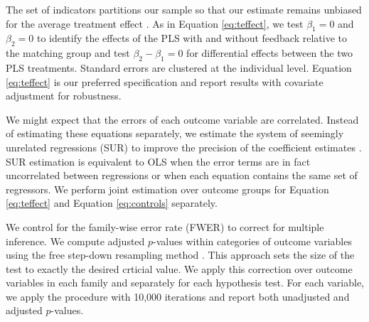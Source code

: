 \documentclass[11pt]{article}
\begin{document}
		The set of indicators partitions our sample so that our estimate remains unbiased for the average treatment effect \parencite{lin_agnostic_2013}. As in Equation \ref{eq:teffect}, we test $\beta_{1} = 0$ and $\beta_{2} = 0$ to identify the effects of the PLS with and without feedback relative to the matching group and test $\beta_{2} - \beta_{1} = 0$ for differential effects between the two PLS treatments. Standard errors are clustered at the individual level. Equation \ref{eq:teffect} is our preferred specification and report results with covariate adjustment for robustness.


		We might expect that the errors of each outcome variable are correlated. Instead of estimating these equations separately, we estimate the system of seemingly unrelated regressions (SUR) to improve the precision of the coefficient estimates \parencite{zellner_efficient_1962}. SUR estimation is equivalent to OLS when the error terms are in fact uncorrelated between regressions or when each equation contains the same set of regressors. We perform joint estimation over outcome groups for Equation \ref{eq:teffect} and Equation \ref{eq:controls} separately.

		We control for the family-wise error rate (FWER) to correct for multiple inference. We compute adjusted $p$-values within categories of outcome variables using the free step-down resampling method \parencite{westfall_resampling-based_1993,anderson_multiple_2008}. This approach sets the size of the test to exactly the desired crticial value. We apply this correction over outcome variables in each family and separately for each hypothesis test. For each variable, we apply the procedure with 10,000 iterations and report both unadjusted and adjusted $p$-values.



\end{document}

